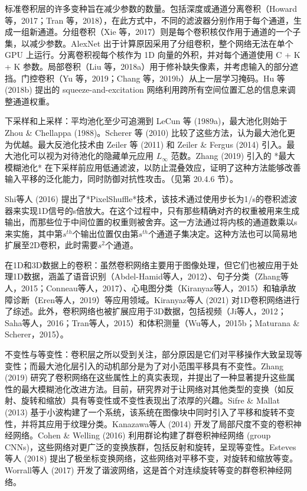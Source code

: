标准卷积层的许多变种旨在减少参数的数量。包括深度或通道分离卷积（Howard 等，2017；Tran 等，2018），在此方式中，不同的滤波器分别作用于每个通道，生成一组新通道。分组卷积（Xie 等，2017）则是每个卷积核仅作用于通道的一个子集，以减少参数。AlexNet 出于计算原因采用了分组卷积，整个网络无法在单个 GPU 上运行。分离卷积视每个核作为 1D 向量的外积，并对每个通道使用 C + K + K 参数。局部卷积（Liu 等，2018a）用于修补缺失像素，并考虑输入的部分遮挡。门控卷积（Yu 等，2019；Chang 等，2019b）从上一层学习掩码。Hu 等 (2018b) 提出的 squeeze-and-excitation 网络利用跨所有空间位置汇总的信息来调整通道权重。

下采样和上采样：平均池化至少可追溯到 LeCun 等 (1989a)，最大池化则始于 Zhou \& Chellappa (1988)。Scherer 等 (2010) 比较了这些方法，认为最大池化更为优越。最大反池化技术由 Zeiler 等 (2011) 和 Zeiler \& Fergus (2014) 引入。最大池化可以视为对待池化的隐藏单元应用 \(L_{\infty}\) 范数。Zhang (2019) 引入的 *最大模糊池化* 在下采样前应用低通滤波，以防止混叠效应，证明了这种方法能够改善输入平移的泛化能力，同时防御对抗性攻击。（见第 20.4.6 节）。

Shi等人 (2016) 提出了*PixelShuffle*技术，该技术通过使用步长为1/s的卷积滤波器来实现1D信号的s倍放大。在这个过程中，只有那些精确对齐的权重被用来生成输出，而那些位于中间位置的权重则被舍弃。这一方法通过将内核的通道数乘以s来实施，其中第\(s^{th}\)个输出位置仅由第\(s^{th}\)个通道子集决定。这种方法也可以简易地扩展至2D卷积，此时需要\(s^2\)个通道。

在1D和3D数据上的卷积：虽然卷积网络主要用于图像处理，但它们也被应用于处理1D数据，涵盖了语音识别（Abdel-Hamid等人，2012）、句子分类（Zhang等人，2015；Conneau等人，2017）、心电图分类（Kiranyaz等人，2015）和轴承故障诊断（Eren等人，2019）等应用领域。Kiranyaz等人 (2021) 对1D卷积网络进行了综述。此外，卷积网络也被扩展应用于3D数据，包括视频（Ji等人，2012；Saha等人，2016；Tran等人，2015）和体积测量（Wu等人，2015b；Maturana \& Scherer，2015）。

不变性与等变性：卷积层之所以受到关注，部分原因是它们对平移操作大致呈现等变性；而最大池化层引入的动机部分是为了对小范围平移具有不变性。Zhang (2019) 研究了卷积网络在这些属性上的真实表现，并提出了一种显著提升这些属性的最大模糊池化改进方法。目前，研究界对于让网络对其他类型的变换（如反射、旋转和缩放）具有等变性或不变性表现出了浓厚的兴趣。Sifre \& Mallat (2013) 基于小波构建了一个系统，该系统在图像块中同时引入了平移和旋转不变性，并将其应用于纹理分类。Kanazawa等人 (2014) 开发了局部尺度不变的卷积神经网络。Cohen \& Welling (2016) 利用群论构建了群卷积神经网络 (group CNNs)，这些网络对更广泛的变换族群，包括反射和旋转，呈现等变性。Esteves等人 (2018) 提出了极坐标变换网络，这些网络对平移不变，对旋转和缩放等变。Worrall等人 (2017) 开发了谐波网络，这是首个对连续旋转等变的群卷积神经网络。

